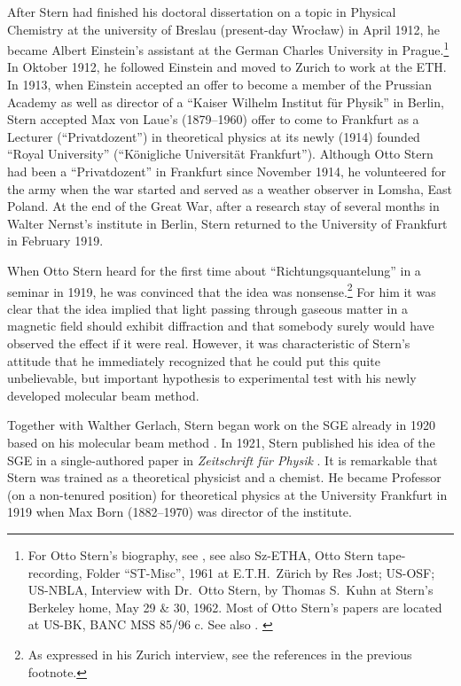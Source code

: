 \documentclass[12pt]{article}
\begin{document}
After Stern had finished his doctoral dissertation on a topic in Physical Chemistry at the university of Breslau (present-day Wroc\l{}aw) in April 1912, he became Albert Einstein's assistant at the German Charles University in Prague.\footnote{For Otto Stern's biography, see  \citep{SchmidtBoeckingHEtal2011Stern,ToenniesJEtal2011Stern}, see also Sz-ETHA, Otto Stern tape-recording, Folder ``ST-Misc'', 1961 at E.T.H.\ Z\"urich by Res Jost; US-OSF; US-NBLA, Interview with Dr.~Otto Stern, by Thomas S.~Kuhn at Stern's Berkeley home, May 29 \& 30, 1962. Most of Otto Stern's papers are located at US-BK, BANC MSS 85/96 c.
See also \citep{FriedrichBEtal1998Star}.
\label{note:stern_bio}} In Oktober 1912, he followed Einstein and moved to Zurich to work at the ETH. In 1913, when Einstein accepted an offer to become a member of the Prussian Academy as well as director of a ``Kaiser Wilhelm Institut für Physik'' in Berlin, Stern accepted Max von Laue's (1879--1960) offer to come to Frankfurt as a Lecturer (``Privatdozent'') in theoretical physics at its newly (1914) founded “Royal University” (``Königliche Universität Frankfurt''). Although Otto Stern had been a ``Privatdozent'' in Frankfurt since November 1914, he volunteered for the army when the war started and served as a weather observer in Lomsha, East Poland. At the end of the Great War, after a research stay of several months in Walter Nernst's institute in Berlin, Stern returned to the University of Frankfurt in February 1919. 

When Otto Stern heard for the first time about ``Richtungsquantelung'' in a seminar in 1919, he was convinced that the idea was nonsense.\footnote{As expressed in his Zurich interview, see the references in the previous footnote.} For him it was clear that the idea implied that light passing through gaseous matter in a magnetic field should exhibit diffraction and that somebody surely would have observed the effect if it were real. However, it was characteristic of Stern's attitude that he immediately recognized that he could put this quite unbelievable, but important hypothesis to experimental test with his newly developed molecular beam method.  

Together with Walther Gerlach, Stern began work on the SGE already in 1920 based on his molecular beam method \citep{SternO1920Messung,SternO1920Messung2,SternO1920Nachtrag}. In 1921, Stern published his idea of the SGE in a single-authored paper in \emph{Zeitschrift für Physik} \citep{SternO1921Weg}. It is remarkable that Stern was trained as a theoretical physicist and a chemist. He became Professor (on a non-tenured position) for theoretical physics at the University Frankfurt in 1919 when Max Born (1882--1970) was director of the institute. 
\end{document}
